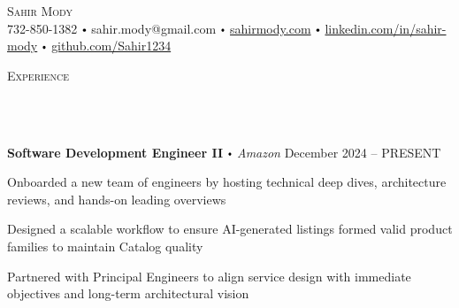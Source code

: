 \documentclass{article}
\newcommand{\contact}[3]{
\vspace*{3pt}
\begin{center}
{\Huge \scshape {#1}}\\
\vspace{0pt}
#2 
\vspace{0pt}
#3
\end{center}
\vspace*{-3pt}
}
\newcommand{\header}[1]{{
\hspace*{-15pt}\vspace*{10pt} \large \scshape{#1}} \vspace*{-6pt} 
\lineunder
}
\newcommand{\lineunder}{
\vspace*{-8pt} \\ \hspace*{-18pt} 
\hrulefill \\
}
\newcommand{\employer}[4]{
\textbf{#1} \labelitemi \textit{#2} \hfill #3 \\ #4 \vspace*{3pt}
}
\renewcommand{\labelitemi}{
$\vcenter{\hbox{\tiny$\bullet$}}$\hspace*{3pt}
}
\renewcommand{\labelitemii}{
$\vcenter{\hbox{\tiny$\bullet$}}$\hspace*{-3pt}
}
\newenvironment{bullet-list-minor}{
\begin{list}{\labelitemii}{\setlength\leftmargin{15pt} 
\topsep 0pt \itemsep 1pt}}{\vspace*{4pt}\end{list}
}
\begin{document}
\small
\vspace*{-64pt}

\contact{Sahir Mody}\bigskip
{{732-850-1382}\labelitemi{sahir.mody@gmail.com}\labelitemi\href{https://sahirmody.com}{sahirmody.com}\labelitemi\href{https://www.linkedin.com/in/sahir-mody}{linkedin.com/in/sahir-mody}  \labelitemi\href{https://www.github.com/Sahir1234}{github.com/Sahir1234}}
\medskip
\header{Experience}
    \vspace{6pt}
    \employer{Software Development Engineer II}{Amazon}{December 2024 -- PRESENT}{}
    \smallskip
    \begin{bullet-list-minor}
        \item Onboarded a new team of engineers by hosting technical deep dives, architecture reviews, and hands-on leading overviews
        \item Designed a scalable workflow to ensure AI-generated listings formed valid product families to maintain Catalog quality
        \item Partnered with Principal Engineers to align service design with immediate objectives and long-term architectural vision
    \end{bullet-list-minor}
    \medskip
    \smallskip
    
\end{document}
